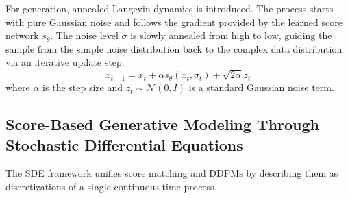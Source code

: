 For generation, annealed Langevin dynamics is introduced. The process starts with pure Gaussian noise and follows the gradient provided by the learned score network $s_\theta$. The noise level $\sigma$ is slowly annealed from high to low, guiding the sample from the simple noise distribution back to the complex data distribution via an iterative update step:
\begin{equation}
	x_{t-1} = x_{t} + \alpha s_{\theta} (x_t, \sigma_t )+ \sqrt{2\alpha}z_t 
\end{equation}
where $\alpha$ is the step size and $z_t \sim \mathcal{N}(0,I)$ is a standard Gaussian noise term.

\subsection{Score-Based Generative Modeling Through Stochastic Differential  Equations}
The SDE framework unifies score matching and DDPMs by describing them as discretizations of a single continuous-time process \cite{songScoreBasedGenerativeModeling2021a}.

